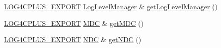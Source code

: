 \begin{DoxyCompactItemize}
\hyperlink{config_8hxx_ab13cb1a5317c245ee2ef4f2bfe0cfb2d}{L\-O\-G4\-C\-P\-L\-U\-S\-\_\-\-E\-X\-P\-O\-R\-T} \hyperlink{classlog4cplus_1_1LogLevelManager}{Log\-Level\-Manager} \& \hyperlink{namespacelog4cplus_a91c0d122cd3a692285de88e42a398773}{get\-Log\-Level\-Manager} ()
\item 
\hyperlink{config_8hxx_ab13cb1a5317c245ee2ef4f2bfe0cfb2d}{L\-O\-G4\-C\-P\-L\-U\-S\-\_\-\-E\-X\-P\-O\-R\-T} \hyperlink{classlog4cplus_1_1MDC}{M\-D\-C} \& \hyperlink{namespacelog4cplus_ad4bdb6629672b5ccc89a7281117ecabd}{get\-M\-D\-C} ()
\item 
\hyperlink{config_8hxx_ab13cb1a5317c245ee2ef4f2bfe0cfb2d}{L\-O\-G4\-C\-P\-L\-U\-S\-\_\-\-E\-X\-P\-O\-R\-T} \hyperlink{classlog4cplus_1_1NDC}{N\-D\-C} \& \hyperlink{namespacelog4cplus_a091093fda05383d6415ed5d146bc589f}{get\-N\-D\-C} ()
\end{DoxyCompactItemize}
